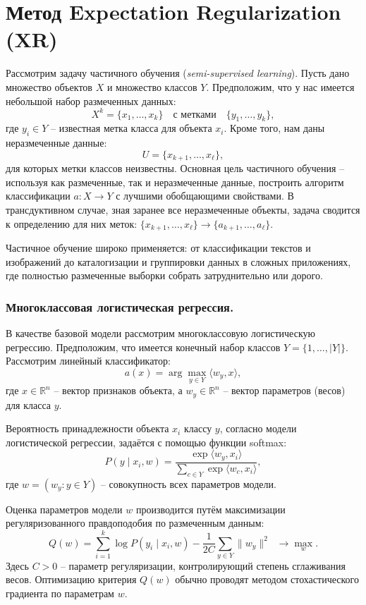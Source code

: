 \section{Метод Expectation Regularization (XR)}

Рассмотрим задачу частичного обучения (\textit{semi-supervised learning}). Пусть дано множество объектов $X$ и множество классов $Y$. Предположим, что у нас имеется небольшой набор размеченных данных:
\[
X^k = \{ x_1, \ldots, x_k \} \quad \text{с метками} \quad \{y_1, \ldots, y_k\},
\]
где $y_i \in Y$ – известная метка класса для объекта $x_i$. Кроме того, нам даны неразмеченные данные:
\[
U = \{x_{k+1}, \ldots, x_{\ell}\},
\]
для которых метки классов неизвестны. Основная цель частичного обучения – используя как размеченные, так и неразмеченные данные, построить алгоритм классификации $a: X \rightarrow Y$ с лучшими обобщающими свойствами. В трансдуктивном случае, зная заранее все неразмеченные объекты, задача сводится к определению для них меток: $\{x_{k+1}, \ldots, x_{\ell}\} \rightarrow \{a_{k+1}, \ldots, a_{\ell}\}$.


Частичное обучение широко применяется: от классификации текстов и изображений до каталогизации и группировки данных в сложных приложениях, где полностью размеченные выборки собрать затруднительно или дорого.

\subsubsection*{Многоклассовая логистическая регрессия.}

В качестве базовой модели рассмотрим многоклассовую логистическую регрессию. Предположим, что имеется конечный набор классов $Y = \{1, \ldots, |Y|\}$. Рассмотрим линейный классификатор:
\[
a(x) = \arg \max_{y \in Y} \langle w_y, x \rangle, 
\]
где $x \in \mathbb{R}^n$ – вектор признаков объекта, а $w_y \in \mathbb{R}^n$ – вектор параметров (весов) для класса $y$.

Вероятность принадлежности объекта $x_i$ классу $y$, согласно модели логистической регрессии, задаётся с помощью функции softmax:
\[
P(y \mid x_i, w) = \frac{\exp\langle w_y, x_i \rangle}{\sum_{c \in Y} \exp\langle w_c, x_i \rangle},
\]
где $w = (w_y: y \in Y)$ – совокупность всех параметров модели.

Оценка параметров модели $w$ производится путём максимизации регуляризованного правдоподобия по размеченным данным:
\[
Q(w) = \sum_{i=1}^k \log P(y_i \mid x_i, w) - \frac{1}{2C}\sum_{y \in Y}\|w_y\|^2 \;\; \to \max_w.
\]
Здесь $C > 0$ – параметр регуляризации, контролирующий степень сглаживания весов. Оптимизацию критерия $Q(w)$ обычно проводят методом стохастического градиента по параметрам $w$.

